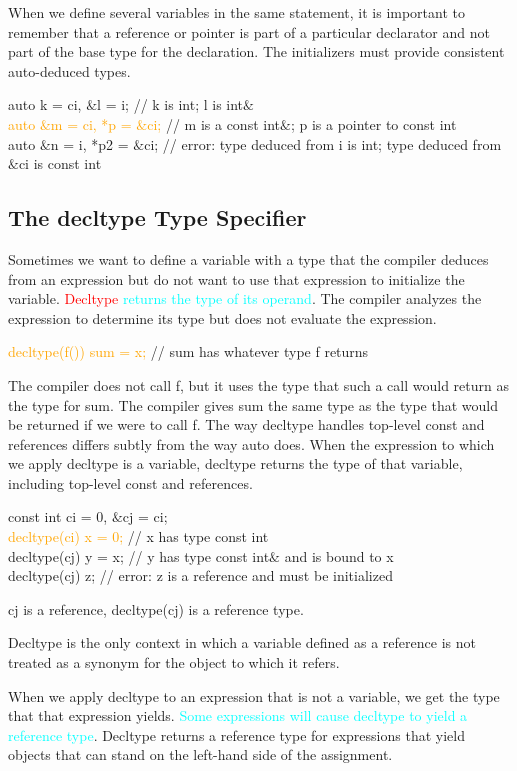 \documentclass[12pt,a4paper]{article}
\begin{document}
When we define several variables in the same statement, it is important to remember that a reference or pointer is part of a particular declarator and not part of the base type for the declaration. The initializers must provide consistent auto-deduced types.

auto k = ci, $\&$l = i; // k is int; l is int$\&$ \\
\textcolor{orange}{auto $\&$m = ci, *p = $\&$ci;} // m is a const int$\&$; p is a pointer to const int \\
auto $\&$n = i, *p2 = $\&$ci; // error: type deduced from i is int; type deduced from $\&$ci is const int 


\subsection{The decltype Type Specifier}
Sometimes we want to define a variable with a type that the compiler deduces from an expression but do not want to use that expression to initialize the variable. \textcolor{red}{Decltype} \textcolor{cyan}{returns the type of its operand}. The compiler analyzes the expression to determine its type but does not evaluate the expression.

\textcolor{orange}{decltype(f()) sum = x;} // sum has whatever type f returns

The compiler does not call f, but it uses the type that such a call would return as the type for sum. The compiler gives sum the same type as the type that would be returned if we were to call f. The way decltype handles top-level const and references differs subtly from the way auto does. When the expression to which we apply decltype is a variable, decltype returns the type of that variable, including top-level const and references.

const int ci = 0, $\&$cj = ci; \\
\textcolor{orange}{decltype(ci) x = 0;} // x has type const int \\
decltype(cj) y = x; // y has type const int$\&$ and is bound to x \\
decltype(cj) z; // error: z is a reference and must be initialized

cj is a reference, decltype(cj) is a reference type.

Decltype is the only context in which a variable defined as a reference is not treated as a synonym for the object to which it refers.

When we apply decltype to an expression that is not a variable, we get the type that that expression yields. \textcolor{cyan}{Some expressions will cause decltype to yield a reference type}. Decltype returns a reference type for expressions that yield objects that can stand on the left-hand side of the assignment.
\end{document}
